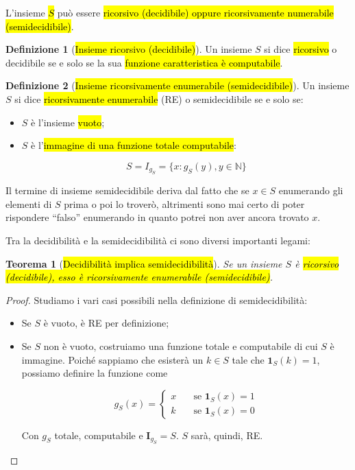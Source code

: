 \documentclass[a4paper,11pt,oneside]{article}
\theoremstyle{plain}
\newtheorem{thm}{Teorema}[section]
\theoremstyle{definition}
\newtheorem{defn}{Definizione}[section]
\theoremstyle{remark}
\begin{document}
L'insieme \hl{$S$} può essere \hl{ricorsivo (decidibile) oppure ricorsivamente
numerabile (semidecidibile)}.

\begin{defn}[\hl{Insieme ricorsivo (decidibile)}]\label{def:insieme-decidibile}
  Un insieme $S$ si dice \hl{ricorsivo} o decidibile se e solo se la sua
  \hl{funzione caratteristica è computabile}.
\end{defn}

\begin{defn}[\hl{Insieme ricorsivamente enumerabile (semidecidibile)}]\label{def:insieme-semidecidibile}
  Un insieme $S$ si dice \hl{ricorsivamente enumerabile} (RE) o semidecidibile
  se e solo se:

  \begin{itemize}
    \item $S$ è l'insieme \hl{vuoto};
    \item $S$ è l'\hl{immagine di una funzione totale computabile}:

      \begin{equation}
        S = I_{g_S} = \{ x: g_S(y), y \in \mathbb{N} \}
      \end{equation}
  \end{itemize}
\end{defn}

Il termine di insieme semidecidibile deriva dal fatto che se $x \in S$
enumerando gli elementi di $S$ prima o poi lo troverò, altrimenti sono mai certo
di poter rispondere ``falso'' enumerando in quanto potrei non aver ancora
trovato $x$.

Tra la decidibilità e la semidecidibilità ci sono diversi importanti legami:

\begin{thm}[\hl{Decidibilità implica semidecidibilità}]\label{thm:dec-semidec}
  Se un insieme $S$ è \hl{ricorsivo (decidibile), esso è ricorsivamente
  enumerabile (semidecidibile)}.
\end{thm}
\begin{proof}
  Studiamo i vari casi possibili nella definizione di semidecidibilità:

  \begin{itemize}
    \item Se $S$ è vuoto, è RE per definizione;
    \item Se $S$ non è vuoto, costruiamo una funzione totale e computabile di
      cui $S$ è immagine. Poiché sappiamo che esisterà un $k \in S$ tale che
      $\mathbf{1}_S(k) = 1$, possiamo definire la funzione come

      \[
        g_S(x) =
        \begin{cases}
          x & \quad \text{se } \mathbf{1}_S(x) = 1 \\
          k & \quad \text{se } \mathbf{1}_S(x) = 0
        \end{cases}
      \]

      Con $g_S$ totale, computabile e $\mathbf{I}_{g_S} = S$. $S$ sarà, quindi,
      RE\@.
  \end{itemize}
\end{proof}
\end{document}
